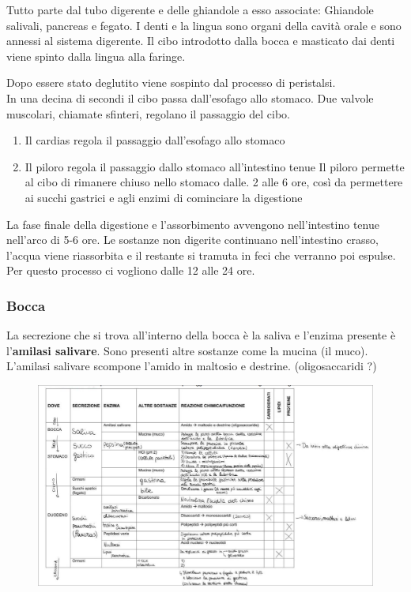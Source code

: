 \documentclass[a4paper]{article}
\begin{document}
Tutto parte dal tubo digerente e delle ghiandole a esso associate:
Ghiandole salivali, pancreas e fegato. I denti e la lingua sono organi
della cavità orale e sono annessi al sistema digerente.
Il cibo introdotto dalla bocca e masticato dai denti viene spinto dalla
lingua alla faringe.


Dopo essere stato deglutito viene sospinto dal
processo di peristalsi.
\\
In una decina di secondi il cibo passa dall'esofago allo stomaco. Due
valvole muscolari, chiamate sfinteri, regolano il passaggio del cibo.

\begin{enumerate}
    \item Il cardias regola il passaggio dall'esofago allo stomaco
    \item Il piloro regola il passaggio dallo stomaco all'intestino tenue
    Il piloro permette al cibo di rimanere chiuso nello stomaco dalle.
    2 alle 6 ore, così da permettere ai succhi gastrici e agli enzimi
    di cominciare la digestione
\end{enumerate}

La fase finale della digestione e l'assorbimento avvengono
nell'intestino tenue nell'arco di 5-6 ore. Le sostanze non digerite
continuano nell'intestino crasso, l'acqua viene riassorbita e il restante
si tramuta in feci che verranno poi espulse. Per questo processo ci
vogliono dalle 12 alle 24 ore.

\subsubsection{Bocca}

La secrezione che si trova all'interno della bocca è la saliva e l'enzima
presente è l'\textbf{amilasi salivare}.
Sono presenti altre sostanze come la mucina (il muco).
L'amilasi salivare scompone l'amido in maltosio e destrine. (oligosaccaridi ?)

\pagebreak

\begin{figure}[th]
    \centering
    \includegraphics[width=\textwidth]{./tabella.png}
\end{figure}
\end{document}
